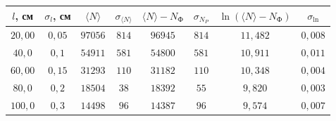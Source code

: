 \begin{tabular}{| c | c | c | c | c | c | c | c |}
\hline
$l$, см & $\sigma_l$, см & $\langle N \rangle$ & $\sigma_{\langle N \rangle}$ &
$\langle N \rangle-N_{\text{Ф}}$ & $\sigma_{N_P}$ & $\ln{(\langle N
\rangle-N_{\text{Ф}})}$ & $\sigma_{\ln}$\\
\hline
$20,00$ & $0,05$ & $97056$ & $814$ & $96945$ & $814$ & $11,482$ & $0,008$\\
\hline
$40,0$ & $0,1$ & $54911$ & $581$ & $54800$ & $581$ & $10,911$ & $0,011$\\
\hline
$60,00$ & $0,15$ & $31293$ & $110$ & $31182$ & $110$ & $10,348$ & $0,004$\\
\hline
$80,0$ & $0,2$ & $18504$ & $38$ & $18392$ & $55$ & $9,820$ & $0,003$\\
\hline
$100,0$ & $0,3$ & $14498$ & $96$ & $14387$ & $96$ & $9,574$ & $0,007$\\
\hline
\end{tabular}
